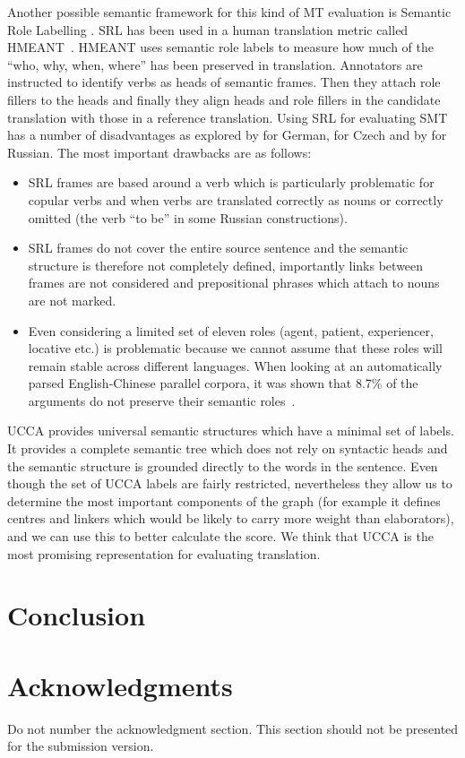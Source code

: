 \documentclass[11pt]{article}
\def\inparcite#1{\newcite{#1}}
\begin{document}
Another possible semantic framework for this kind of MT evaluation is Semantic
Role Labelling 
\cite{palmer2010semantic}.
SRL has been used in a human translation metric called HMEANT~\cite{lo2011structured}. 
HMEANT uses semantic role labels
to measure how much of the “who, why, when,
where” has been preserved in translation. Annotators are instructed to identify verbs as
heads of semantic frames. Then they attach role
fillers to the heads and finally they align heads
and role fillers in the candidate translation with
those in a reference translation. Using SRL for evaluating SMT has a number of
disadvantages as explored by
 for German,  for
Czech and by  for Russian.
The most important drawbacks are as follows:
\begin{itemize}
\item SRL frames are based around a verb which is particularly problematic for
copular verbs and  when verbs are translated correctly as nouns or correctly
omitted (the verb ``to be'' in some Russian constructions).
\item SRL frames do not cover the entire source sentence and the semantic structure is
therefore not completely defined, importantly links between frames are not
considered and prepositional phrases which attach to nouns are not marked.
\item Even considering a limited set of eleven roles (agent, patient,
experiencer, locative etc.) is problematic because we cannot assume that these roles will 
 remain stable across different languages. 
 When looking at an automatically parsed  English-Chinese  parallel corpora,
 it was shown that 8.7\% of the arguments do not preserve their semantic roles~\cite{fung2006automatic}. 
\end{itemize}

UCCA provides universal semantic structures which 
have
a minimal set of labels. It provides a complete semantic tree which does not rely on syntactic heads and the semantic structure is grounded directly to the words in the sentence. 
 Even though the set of UCCA labels are fairly restricted,  nevertheless they allow us to determine the most important components of the graph (for example it defines centres and linkers which would be likely to carry more weight than elaborators), and we can use this to better calculate the score. 
We think that UCCA is the
most promising representation for evaluating translation. 


\section{Conclusion}

\section*{Acknowledgments}

Do not number the acknowledgment section.
This section should not be presented for the submission version.



\end{document}
